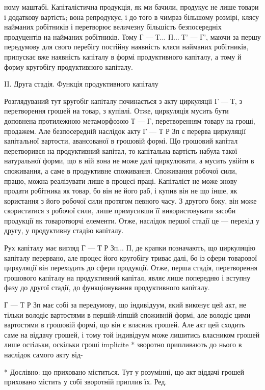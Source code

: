 ному маштабі. Капіталістична продукція, як ми бачили, продукує не
лише товари і додаткову вартість; вона репродукує, і до того в чимраз
більшому розмірі, клясу найманих робітників і перетворює величезну
більшість безпосередніх продуцентів на найманих робітників. Тому
Г — Т... П... Т' — Г', маючи за першу передумову для свого перебігу
постійну наявність кляси найманих робітників, припускає вже наявність
капіталу в формі продуктивного капіталу, а тому й форму кругобігу
продуктивного капіталу.

II. Друга стадія. Функція продуктивного капіталу

Розглядуваний тут кругобіг капіталу починається з акту циркуляції
Г — Т, з перетворення грошей на товар, з купівлі. Отже, циркуляція
мусить бути доповнена протилежною метаморфозою Т — Г, перетворенням
товару на гроші, продажем. Але безпосередній наслідок акту
Г — Т Р Зп є перерва циркуляції капітальної вартости, авансованої в
грошовій формі. Що грошовий капітал перетворився на продуктивний
капітал, то капітальна вартість набула такої натуральної форми, що в
ній вона не може далі циркулювати, а мусить увійти в споживання, а
саме в продуктивне споживання. Споживання робочої сили, працю, можна
реалізувати лише в процесі праці. Капіталіст не може знову продати
робітника як товар, бо він не його раб, і купив він не що інше, як
користання з його робочої сили протягом певного часу. З другого боку,
він може скористатися з робочої сили, лише примусивши її використовувати
засоби продукції як товаротворчі елементи. Отже, наслідок першої
стадії це — перехід у другу, у продуктивну стадію капіталу.

Рух капіталу має вигляд Г — Т Р Зп... П, де крапки позначають, що
циркуляцію капіталу перервано, але процес його кругобігу триває далі,
бо із сфери товарової циркуляції він переходить до сфери продукції.
Отже, перша стадія, перетворення грошового капіталу на продуктивний
капітал, являє лише попередню і вступну фазу до другої стадії, до
функціонування продуктивного капіталу.

Г — Т Р Зп має собі за передумову, що індивідуум, який виконує цей
акт, не тільки володіє вартостями в першій-ліпшій споживній формі,
але володіє цими вартостями в грошовій формі, що він є власник грошей.
Але акт цей сходить саме на віддачу грошей, і тому той індивідуум
може лишитись власником грошей лише остільки, оскільки гроші
implicite * зворотно припливають до нього в наслідок самого акту від-

* Дослівно: що приховано міститься. Тут у розумінні, що акт віддачі грошей приховано містить у собі 
зворотній приплив їх. Ред.
